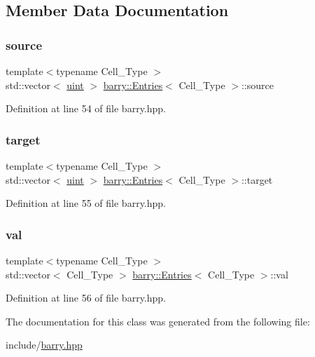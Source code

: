 \subsection{Member Data Documentation}
\mbox{\label{classbarry_1_1_entries_a5992282ca5f39dbbbd4195d7176b6295}} 
\subsubsection{\texorpdfstring{source}{source}}
{\footnotesize\ttfamily template$<$typename Cell\+\_\+\+Type $>$ \\
std\+::vector$<$ \hyperlink{namespacebarry_a11dfc53ddb4672278319aa04f1e09a6c}{uint} $>$ \hyperlink{classbarry_1_1_entries}{barry\+::\+Entries}$<$ Cell\+\_\+\+Type $>$\+::source}



Definition at line 54 of file barry.\+hpp.

\mbox{\label{classbarry_1_1_entries_a07de39535af23bc1f9e3918b32a39b18}} 
\subsubsection{\texorpdfstring{target}{target}}
{\footnotesize\ttfamily template$<$typename Cell\+\_\+\+Type $>$ \\
std\+::vector$<$ \hyperlink{namespacebarry_a11dfc53ddb4672278319aa04f1e09a6c}{uint} $>$ \hyperlink{classbarry_1_1_entries}{barry\+::\+Entries}$<$ Cell\+\_\+\+Type $>$\+::target}



Definition at line 55 of file barry.\+hpp.

\mbox{\label{classbarry_1_1_entries_af2570fcd2f42e9a1704f9c254507284c}} 
\subsubsection{\texorpdfstring{val}{val}}
{\footnotesize\ttfamily template$<$typename Cell\+\_\+\+Type $>$ \\
std\+::vector$<$ Cell\+\_\+\+Type $>$ \hyperlink{classbarry_1_1_entries}{barry\+::\+Entries}$<$ Cell\+\_\+\+Type $>$\+::val}



Definition at line 56 of file barry.\+hpp.



The documentation for this class was generated from the following file\+:\begin{DoxyCompactItemize}
\item 
include/\hyperlink{barry_8hpp}{barry.\+hpp}\end{DoxyCompactItemize}
